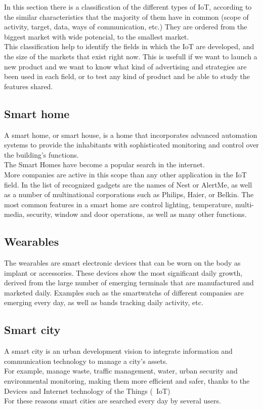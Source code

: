 
In this section there is a classification of the different types of IoT, according to the similar characteristics that the majority of them have in common (scope of activity, target, data, ways of communication, etc.) They are ordered from the biggest market with wide potencial, to the smallest market. \\
This classification help to identify the fields in which the IoT are developed, and the size of the markets that exist right now. This is usefull if we want to launch a new product and we want to know what kind of advertising and strategies are been used in each field, or to test any kind of product and be able to study the features shared.

\subsection{Smart home} A smart home, or smart house, is a home that incorporates advanced automation systems to provide the inhabitants with sophisticated monitoring and control over the building's functions.\\ The Smart Homes have become a popular search in the internet.\\ More companies are active in this scope than any other application in the IoT field. In the list of recognized gadgets are the names of Nest or AlertMe, as well as a number of multinational corporations such as Philips, Haier, or Belkin. The most common features in a smart home are control lighting, temperature, multi-media, security, window and door operations, as well as many other functions.

\subsection{Wearables} The wearables are smart electronic devices that can be worn on the body as implant or accessories. These devices show the most significant daily growth, derived from the large number of emerging terminals that are manufactured and marketed daily. Examples such as the smartwatchs of different companies are emerging every day, as well as bands tracking daily activity, etc.

\subsection{Smart city} A smart city is an urban development vision to integrate information and communication technology to manage a city's assets.\\ For example, manage waste, traffic management, water, urban security and environmental monitoring, making them more efficient and safer, thanks to the Devices and Internet technology of the Things (\ IoT)\\ For these reasons smart cities are searched every day by several users.

